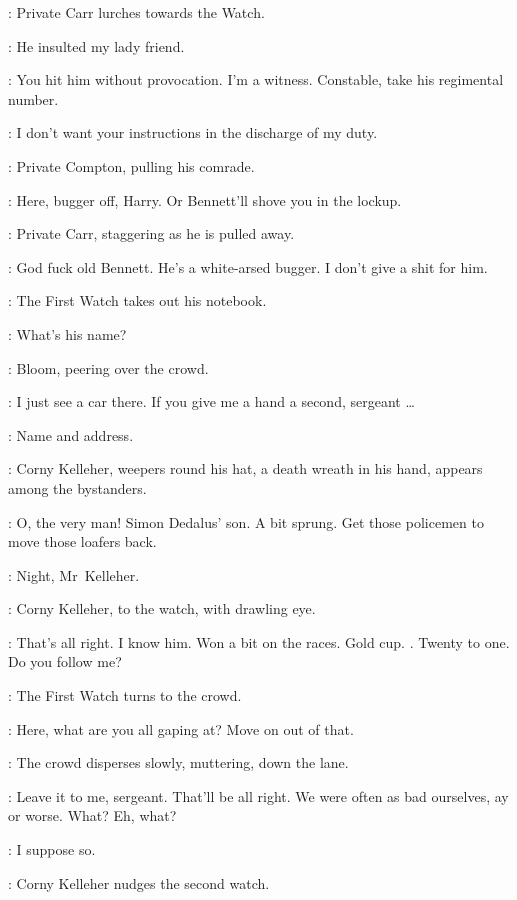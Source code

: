 :
Private Carr lurches towards the Watch.

\Carr:
He insulted my lady friend.

\Bloom:
You hit him without provocation.
I'm a witness.
Constable, take his regimental number.

\SecondWatch[2]:
I don't want your instructions in the discharge of my duty.

:
Private Compton, pulling his comrade.

\Compton:
Here, bugger off, Harry.
Or Bennett'll shove you in the lockup.

:
Private Carr, staggering as he is pulled away.

\Carr:
God fuck old Bennett.
He's a white-arsed bugger.
I don't give a shit for him.

:
The First Watch takes out his notebook.

\FirstWatch:
What's his name?

:
Bloom, peering over the crowd.

\Bloom:
I just see a car there.
If you give me a hand a second, sergeant \ldots

\FirstWatch:
Name and address.

:
Corny Kelleher, weepers round his hat, a death wreath in his hand,
appears among the bystanders.

\Bloom:
O, the very man!
Simon Dedalus' son.
A bit sprung.
Get those policemen to move those loafers back.

\SecondWatch[2]:
Night, Mr~Kelleher.

:
Corny Kelleher, to the watch, with drawling eye.

\Corny:
That's all right.
I know him.
Won a bit on the races.
Gold cup.
.
Twenty to one.
Do you follow me?

:
The First Watch turns to the crowd.

\FirstWatch:
Here, what are you all gaping at?
Move on out of that.

:
The crowd disperses slowly, muttering, down the lane.

\Corny:
Leave it to me, sergeant.
That'll be all right.
We were often as bad ourselves, ay or worse.
What? Eh, what?

\FirstWatch:
I suppose so.

:
Corny Kelleher nudges the second watch.

